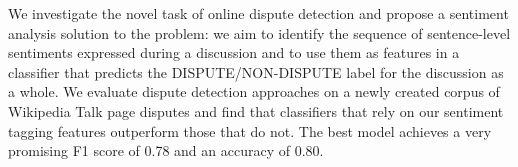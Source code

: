 We investigate the novel task of online dispute detection and propose a sentiment analysis solution to the problem: we aim to identify the sequence of sentence-level sentiments expressed during a discussion and to use them as features in a classifier that predicts the DISPUTE/NON-DISPUTE label for the discussion as a whole. We evaluate dispute detection approaches on a newly created corpus of Wikipedia Talk page disputes and find that classifiers that rely on our sentiment tagging features outperform those that do not. The best model achieves a very promising F1 score of 0.78 and an accuracy of 0.80.
